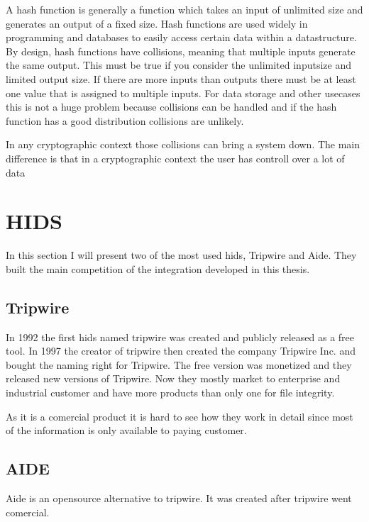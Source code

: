 \documentclass[
	a4paper,					%
	10pt,							%
	twoside,					%
	openright,				%
	notitlepage,			%
	parskip=half,			%
]{scrreprt}					%
\begin{document}
A hash function is generally a function which takes an input of unlimited size and generates an output of a fixed size. Hash functions are used widely in programming and databases to easily access certain data within a datastructure. By design, hash functions have collisions, meaning that multiple inputs generate the same output. This must be true if you consider the unlimited inputsize and limited output size. If there are more inputs than outputs there must be at least one value that is assigned to multiple inputs. For data storage and other usecases this is not a huge problem because collisions can be handled and if the hash function has a good distribution collisions are unlikely.

In any cryptographic context those collisions can bring a system down. The main difference is that in a cryptographic context the user has controll over a lot of data



\section{HIDS}

In this section I will present two of the most used \gls{hids}, Tripwire and Aide. They built the main competition of the integration developed in this thesis.

\subsection{Tripwire}

In 1992 the first \gls{hids} named tripwire was created and publicly released as a free tool. In 1997 the creator of tripwire then created the company Tripwire Inc. and bought the naming right for Tripwire. The free version was monetized and they released new versions of Tripwire. \cite{Tripwire:Impl,Tripwire:company} Now they mostly market to enterprise and industrial customer and have more products than only one for file integrity. \cite{tripwire}

As it is a comercial product it is hard to see how they work in detail since most of the information is only available to paying customer. 

\subsection{AIDE}

Aide is an \gls{opensource} alternative to tripwire. It was created after tripwire went comercial. \cite{aide:totherescue, aide:github}
\end{document}
